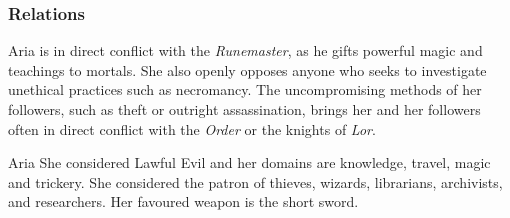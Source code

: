 \subsubsection*{Relations}

Aria is in direct conflict with the \emph{Runemaster}, as he gifts powerful
magic and teachings to mortals. She also openly opposes anyone who seeks to
investigate unethical practices such as necromancy. The uncompromising methods
of her followers, such as theft or outright assassination, brings her and her
followers often in direct conflict with the \emph{Order} or the knights of
\emph{Lor}.

\begin{35e}{Aria}
  She considered Lawful Evil and her domains are knowledge, travel, magic and
  trickery. She considered the patron of thieves, wizards, librarians,
  archivists, and researchers. Her favoured weapon is the short sword.
\end{35e}
